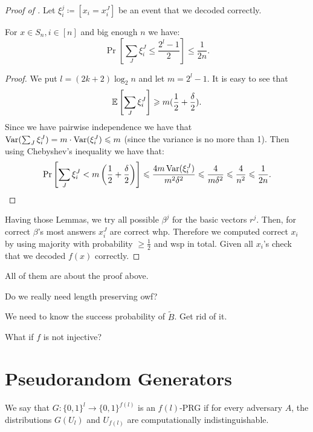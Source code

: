 \begin{proof}[Proof of ]
  Let $\xi_i^j \coloneqq [x_i = x_i^J]$ be an event that we decoded correctly.
   \begin{lemma}
	   For $x \in S_n, i \in [n]$ and big enough $n$ we have:
    \[
		\Pr\left[\sum_J \xi_i^J \leq \frac{2^{l} - 1}{2}\right] \leq \frac{1}{2n}.
    \] 
  \end{lemma}
  \begin{proof}
	  We put $l = (2k + 2) \log_2 n$ and let  $m = 2^{l} - 1$.
	  It is easy to see that
	  \[
		  \mathbb{E}\left[\sum_J \xi_i^J\right] \geqslant m(\frac{1}{2} + \frac{\delta}{2}).
	  \]
	  Since we have pairwise independence we have that $\operatorname{Var}(\sum_J \xi_i^J) = m \cdot \operatorname{Var}(\xi_i^J) \leqslant m$ (since the variance is no more than 1).
	  Then using Chebyshev's inequality we have that:
	   \[
		   \Pr\left[\sum_J \xi_i^J < m\left(\frac{1}{2} + \frac{\delta}{2}\right)\right] \leqslant \frac{4 m \operatorname{Var}(\xi_i^J)}{m^2 \delta^2} \leqslant \frac{4}{m \delta^2} \leqslant \frac{4}{n^2} \leqslant \frac{1}{2n}.
	  \] 
  \end{proof}

  Having those Lemmas, we try all possible $\beta^j$ for the basic vectors  $r^j$.
  Then, for correct $\beta$'s most answers  $x_i^J$ are correct whp.
  Therefore we computed correct  $x_i$ by using majority with probability  $\geq \frac{1}{2}$ and wsp in total.
  Given all $x_i$'s check that we decoded $f(x)$ correctly.
\end{proof}

All of them are about the proof above.
\begin{exercise}
  Do we really need length preserving owf?
\end{exercise}

\begin{exercise}
  We need to know the success probability of $\tilde B$.
  Get rid of it.
\end{exercise}

\begin{exercise}
  What if $f$ is not injective?
\end{exercise}

\section{Pseudorandom Generators}

\begin{definition}
  We say that $G \colon \{0,1\}^l \to \{0,1\}^{f(l)}$ is an $f(l)$-PRG if for every adversary  $A$, the distributions  $G(U_l)$ and  $U_{f(l)}$ are computationally indistinguishable.
\end{definition}

